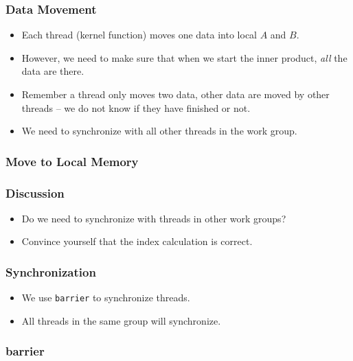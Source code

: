\documentclass{beamer}
\begin{document}
\begin{frame}
\end{frame}

\begin{frame}
  \frametitle{Data Movement}
  \begin{itemize}
    \item Each thread (kernel function) moves one data into local $A$
      and $B$.
    \item However, we need to make sure that when we start the inner
      product, {\em all} the data are there.
    \item Remember a thread only moves two data, other data are moved
      by other threads -- we do not know if they have finished or not.
    \item We need to synchronize with all other threads in the work group.
  \end{itemize}
\end{frame}

\begin{frame}
\end{frame}

\begin{frame}
  \frametitle{Move to Local Memory}
  \centerline{}
\end{frame}


\begin{frame}
  \frametitle{Discussion}
  \begin{itemize}
    \item Do we need to synchronize with threads in other work groups?
    \item Convince yourself that the index calculation is correct.
  \end{itemize}
\end{frame}

\begin{frame}
  \frametitle{Synchronization}
  \begin{itemize}
    \item We use {\tt barrier} to synchronize threads.
    \item All threads in the same group will synchronize.
  \end{itemize}
\end{frame}

\begin{frame}
  \frametitle{barrier}
\end{frame}
\end{document}
